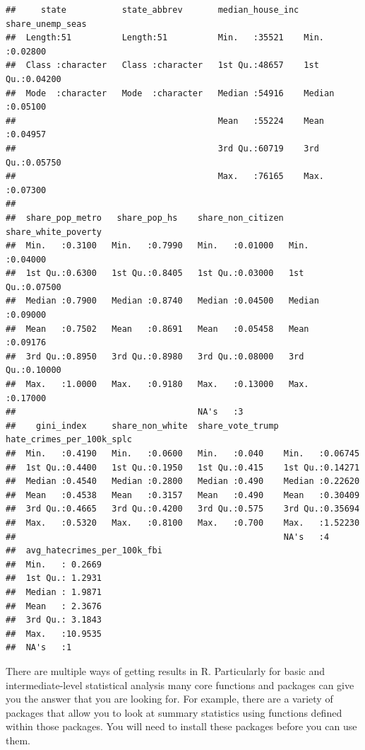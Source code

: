 \documentclass[]{book}
\begin{document}
\begin{verbatim}
##     state           state_abbrev       median_house_inc share_unemp_seas 
##  Length:51          Length:51          Min.   :35521    Min.   :0.02800  
##  Class :character   Class :character   1st Qu.:48657    1st Qu.:0.04200  
##  Mode  :character   Mode  :character   Median :54916    Median :0.05100  
##                                        Mean   :55224    Mean   :0.04957  
##                                        3rd Qu.:60719    3rd Qu.:0.05750  
##                                        Max.   :76165    Max.   :0.07300  
##                                                                          
##  share_pop_metro   share_pop_hs    share_non_citizen share_white_poverty
##  Min.   :0.3100   Min.   :0.7990   Min.   :0.01000   Min.   :0.04000    
##  1st Qu.:0.6300   1st Qu.:0.8405   1st Qu.:0.03000   1st Qu.:0.07500    
##  Median :0.7900   Median :0.8740   Median :0.04500   Median :0.09000    
##  Mean   :0.7502   Mean   :0.8691   Mean   :0.05458   Mean   :0.09176    
##  3rd Qu.:0.8950   3rd Qu.:0.8980   3rd Qu.:0.08000   3rd Qu.:0.10000    
##  Max.   :1.0000   Max.   :0.9180   Max.   :0.13000   Max.   :0.17000    
##                                    NA's   :3                            
##    gini_index     share_non_white  share_vote_trump hate_crimes_per_100k_splc
##  Min.   :0.4190   Min.   :0.0600   Min.   :0.040    Min.   :0.06745          
##  1st Qu.:0.4400   1st Qu.:0.1950   1st Qu.:0.415    1st Qu.:0.14271          
##  Median :0.4540   Median :0.2800   Median :0.490    Median :0.22620          
##  Mean   :0.4538   Mean   :0.3157   Mean   :0.490    Mean   :0.30409          
##  3rd Qu.:0.4665   3rd Qu.:0.4200   3rd Qu.:0.575    3rd Qu.:0.35694          
##  Max.   :0.5320   Max.   :0.8100   Max.   :0.700    Max.   :1.52230          
##                                                     NA's   :4                
##  avg_hatecrimes_per_100k_fbi
##  Min.   : 0.2669            
##  1st Qu.: 1.2931            
##  Median : 1.9871            
##  Mean   : 2.3676            
##  3rd Qu.: 3.1843            
##  Max.   :10.9535            
##  NA's   :1
\end{verbatim}

There are multiple ways of getting results in R. Particularly for basic and intermediate-level statistical analysis many core functions and packages can give you the answer that you are looking for. For example, there are a variety of packages that allow you to look at summary statistics using functions defined within those packages. You will need to install these packages before you can use them.
\end{document}
